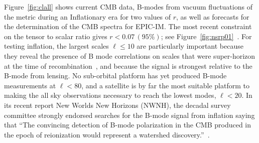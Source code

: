 Figure~\ref{fig:clall} shows current CMB data, B-modes from vacuum fluctuations of the metric during an Inflationary 
era for two values of $r$, as well as forecasts for the determination of the \ac{CMB} spectra for EPIC-IM. 
The most recent constraint on the tensor to scalar ratio gives $r < 0.07 \, (95\%)$; see Figure~\ref{fig:nsrp01}~\cite{Array:2015xqh}. 
For testing inflation, 
the largest scales $\ell \leq 10$ are particularly important because they reveal 
the presence of B mode correlations on scales that were super-horizon at the time of recombination~\cite{Lee:2014cya}, 
and because the signal is strongest relative to the B-mode from lensing. No sub-orbital platform
has yet produced B-mode measurements at $\ell< 80$, and a satellite is by far the most suitable 
platform to making the all sky observations necessary to reach the lowest modes, $\ell<20$. 
In its recent report New Worlds New Horizons (NWNH), the decadal survey committee 
strongly endorsed searches for the B-mode signal from inflation saying that ``The convincing detection of 
B-mode polarization in the CMB produced in the epoch of reionization would represent a watershed discovery.''~\cite{blandford2010}. 
\vspace{-0.1in}
